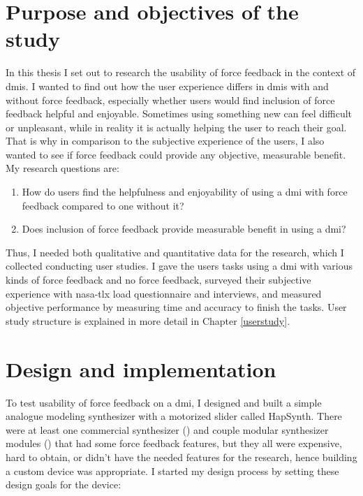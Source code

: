 \section{Purpose and objectives of the study} \label{purpose}

In this thesis I set out to research the usability of force feedback in the context of \glspl{dmi}. I wanted to find out how the user experience differs in \glspl{dmi} with and without force feedback, especially whether users would find inclusion of force feedback helpful and enjoyable. Sometimes using something new can feel difficult or unpleasant, while in reality it is actually helping the user to reach their goal. That is why in comparison to the subjective experience of the users, I also wanted to see if force feedback could provide any objective, measurable benefit. My research questions are:

\begin{enumerate}
	\item How do users find the helpfulness and enjoyability of using a \gls{dmi} with force feedback compared to one without it?
	\item Does inclusion of force feedback provide measurable benefit in using a \gls{dmi}?
\end{enumerate}

Thus, I needed both qualitative and quantitative data for the research, which I collected conducting user studies. I gave the users tasks using a \gls{dmi} with various kinds of force feedback and no force feedback, surveyed their subjective experience with \gls{nasa-tlx} load questionnaire and interviews, and measured objective performance by measuring time and accuracy to finish the tasks. User study structure is explained in more detail in Chapter \ref{userstudy}.

\section{Design and implementation}

To test usability of force feedback on a \gls{dmi}, I designed and built a simple analogue modeling synthesizer with a motorized slider called HapSynth. There were at least one commercial synthesizer (\cite{melbourneinstruments2024}) and couple modular synthesizer modules (\cite{dmm2024, submatrix2024}) that had some force feedback features, but they all were expensive, hard to obtain, or didn't have the needed features for the research, hence building a custom device was appropriate. I started my design process by setting these design goals for the device:


